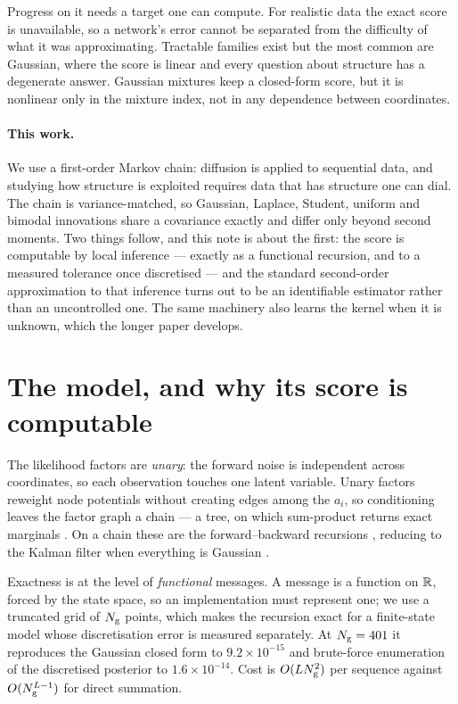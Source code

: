 \documentclass{article}
\theoremstyle{definition}
\theoremstyle{plain}
\begin{document}
Progress on it needs a target one can compute. For realistic data the exact score is unavailable,
so a network's error cannot be separated from the difficulty of what it was approximating.
Tractable families exist but the most common are Gaussian, where the score is linear and every
question about structure has a degenerate answer. Gaussian mixtures keep a closed-form score, but
it is nonlinear only in the mixture index, not in any dependence between coordinates.

\paragraph{This work.} We use a first-order Markov chain: diffusion is applied to sequential data,
and studying how structure is exploited requires data that has structure one can dial. The chain
is variance-matched, so Gaussian, Laplace, Student, uniform and bimodal innovations share a
covariance exactly and differ only beyond second moments. Two things follow, and this note is about
the first: the score is computable by local inference --- exactly as a functional recursion, and
to a measured tolerance once discretised --- and the standard second-order approximation to that
inference turns out to be an identifiable estimator rather than an uncontrolled one. The same machinery also learns the kernel when it is unknown, which the longer
paper develops.

\section{The model, and why its score is computable}



The likelihood factors are \emph{unary}: the forward noise is independent across coordinates, so
each observation touches one latent variable. Unary factors reweight node potentials without
creating edges among the $a_i$, so conditioning leaves the factor graph a chain --- a tree, on
which sum-product returns exact marginals \citep{pearl1988,kschischang2001factor,mezard2009information}. On a chain
these are the forward--backward recursions \citep{baum1970,rabiner1989tutorial}, reducing to the Kalman
filter when everything is Gaussian \citep{kalman1960new,rauch1965maximum}.

Exactness is at the level of \emph{functional} messages. A message is a function on $\mathbb{R}$,
forced by the state space, so an implementation must represent one; we use a truncated grid of
$N_{\mathrm{g}}$ points, which makes the recursion exact for a finite-state model whose discretisation
error is measured separately. At $N_{\mathrm{g}}=401$ it reproduces the Gaussian closed form to
$9.2\times10^{-15}$ and brute-force enumeration of the discretised posterior to
$1.6\times10^{-14}$. Cost is $O(LN_{\mathrm{g}}^{2})$ per sequence against $O(N_{\mathrm{g}}^{L-1})$
for direct summation.
\end{document}
